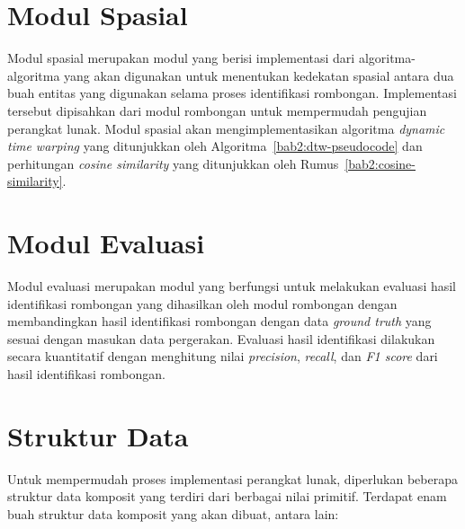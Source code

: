 \section{Modul Spasial}
\label{sec:des-spatial}

Modul spasial merupakan modul yang berisi implementasi dari algoritma-algoritma yang akan digunakan untuk menentukan kedekatan spasial antara dua buah entitas yang digunakan selama proses identifikasi rombongan. Implementasi tersebut dipisahkan dari modul rombongan untuk mempermudah pengujian perangkat lunak. Modul spasial akan mengimplementasikan algoritma \textit{dynamic time warping} yang ditunjukkan oleh Algoritma~\ref{bab2:dtw-pseudocode} dan perhitungan \textit{cosine similarity} yang ditunjukkan oleh Rumus~\ref{bab2:cosine-similarity}.

\section{Modul Evaluasi}
\label{sec:des-evaluation}

Modul evaluasi merupakan modul yang berfungsi untuk melakukan evaluasi hasil identifikasi rombongan yang dihasilkan oleh modul rombongan dengan membandingkan hasil identifikasi rombongan dengan data \textit{ground truth} yang sesuai dengan masukan data pergerakan. Evaluasi hasil identifikasi dilakukan secara kuantitatif dengan menghitung nilai \textit{precision}, \textit{recall}, dan \textit{F1 score} dari hasil identifikasi rombongan.

\section{Struktur Data}
\label{sec:des-struct}

Untuk mempermudah proses implementasi perangkat lunak, diperlukan beberapa struktur data komposit yang terdiri dari berbagai nilai primitif. Terdapat enam buah struktur data komposit yang akan dibuat, antara lain:

